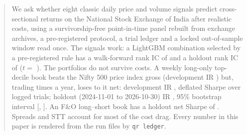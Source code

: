 \begin{abstract}
We ask whether eight classic daily price and volume signals predict cross-sectional returns on the National Stock Exchange of India after
realistic costs, using a survivorship-free point-in-time panel rebuilt from exchange archives, a pre-registered protocol, a trial ledger and a
locked out-of-sample window read once. The signals work: a LightGBM combination selected by a pre-registered rule has a walk-forward rank IC
of  and a holdout rank IC of  ($t=$ ). The portfolios do not survive costs.
A weekly long-only top-decile book beats the Nifty 500 price index gross (development IR ) but, trading
 times a year, loses to it net: development IR , deflated Sharpe  over
 logged trials; holdout (2024-11-01 to 2026-10-30) IR , 95\% bootstrap interval
[, ]. An F\&O long--short book has a holdout net Sharpe of .
Spreads and STT account for most of the cost drag. Every number in this paper is rendered from the run files by \texttt{qr ledger}.
\end{abstract}
